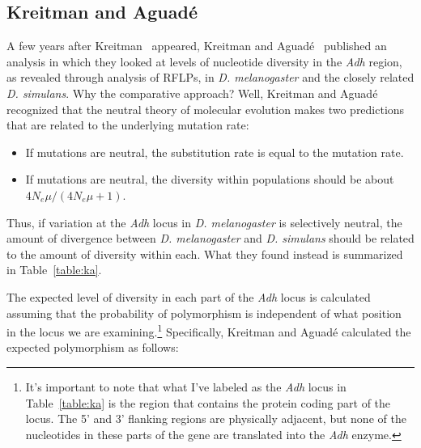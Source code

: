 \subsection*{Kreitman and Aguad{\'e}}

A few years after Kreitman~\cite{Kreitman83} appeared, Kreitman and
Aguad{\'e}~\cite{Kreitman-Aguade86} published an analysis in which
they looked at levels of nucleotide diversity in the {\it Adh\/}
region, as revealed through analysis of RFLPs, in {\it
  D. melanogaster\/} and the closely related {\it D. simulans}. Why
the comparative approach? Well, Kreitman and Aguad{\'e} recognized
that the neutral theory of molecular evolution makes two predictions
that are related to the underlying mutation rate:

\begin{itemize}

\item If mutations are neutral, the substitution rate is equal to the
  mutation rate.

\item If mutations are neutral, the diversity within populations
  should be about $4N_e\mu/(4N_e\mu + 1)$.

\end{itemize}

\noindent Thus, if variation at the {\it Adh\/} locus in {\it
  D. melanogaster\/} is selectively neutral, the amount of divergence
between {\it D. melanogaster\/} and {\it D. simulans\/} should be
related to the amount of diversity within each. What they found
instead is summarized in Table~\ref{table:ka}.

The expected level of diversity in each part of the {\it Adh\/} locus
is calculated assuming that the probability of polymorphism is
independent of what position in the locus we are
examining.\footnote{It's important to note that what I've labeled as
  the {\it Adh\/} locus in Table~\ref{table:ka} is the region that
  contains the protein coding part of the locus. The 5' and 3'
  flanking regions are physically adjacent, but none of the
  nucleotides in these parts of the gene are translated into the {\it
    Adh\/} enzyme.} Specifically, Kreitman and Aguad{\'e} calculated
the expected polymorphism as follows:

